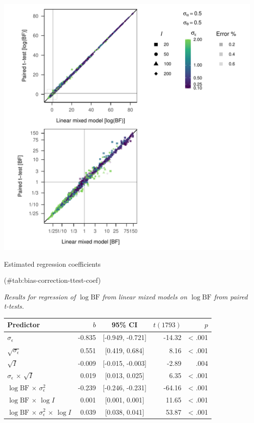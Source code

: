 \documentclass[
  a4paper,
  DIV=11,
  numbers=noendperiod,
  oneside]{scrartcl}
\begin{document}
\includegraphics{prior_translation_files/figure-pdf/bias-correction-ttest-1.pdf}

Estimated regression coefficients

(\#tab:bias-correction-ttest-coef)

\emph{Results for regression of \(\log \mathrm{BF}\) from linear mixed
models on \(\log \mathrm{BF}\) from paired t-tests.}

\begin{longtable}[]{@{}lrcrr@{}}
\toprule()
Predictor & \(b\) & 95\% CI & \(t(1793)\) & \(p\) \\
\midrule()
\endhead
\(\sigma_\epsilon\) & -0.835 & {[}-0.949, -0.721{]} & -14.32 &
\textless{} .001 \\
\(\sqrt{\sigma_\epsilon}\) & 0.551 & {[}0.419, 0.684{]} & 8.16 &
\textless{} .001 \\
\(\sqrt{I}\) & -0.009 & {[}-0.015, -0.003{]} & -2.89 & .004 \\
\(\sigma_\epsilon\) \(\times\) \(\sqrt{I}\) & 0.019 & {[}0.013, 0.025{]}
& 6.35 & \textless{} .001 \\
\(\log \mathrm{BF}\) \(\times\) \(\sigma_\epsilon^2\) & -0.239 &
{[}-0.246, -0.231{]} & -64.16 & \textless{} .001 \\
\(\log \mathrm{BF}\) \(\times\) \(\log I\) & 0.001 & {[}0.001, 0.001{]}
& 11.65 & \textless{} .001 \\
\(\log \mathrm{BF}\) \(\times\) \(\sigma_\epsilon^2\) \(\times\)
\(\log I\) & 0.039 & {[}0.038, 0.041{]} & 53.87 & \textless{} .001 \\
\bottomrule()
\end{longtable}
\end{document}
